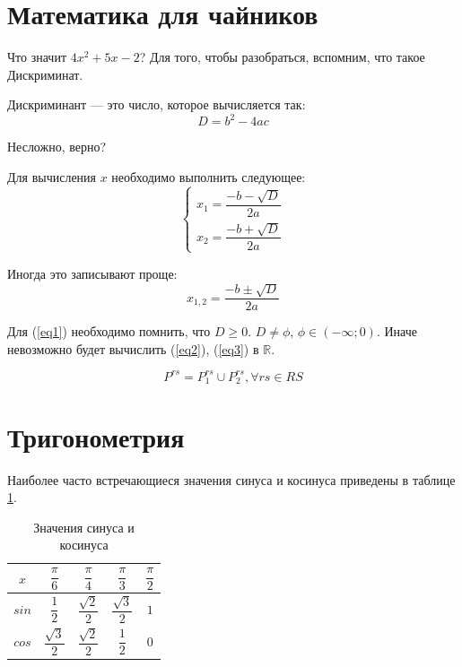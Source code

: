 \documentclass[120.214pt]{article}%
\begin{document}
\section{Математика для чайников}
Что значит $ 4x^{2} + 5x -2$?
Для того, чтобы разобраться, вспомним, что такое Дискриминат.

Дискриминант --- это число, которое вычисляется так:
\begin{equation}
D = b^{2} - 4ac
\label{eq1}
\end{equation}

Несложно, верно?

Для вычисления $ x $ необходимо выполнить следующее:
\begin{equation}
\left\lbrace 
\begin{aligned}
x_{1} = \dfrac{-b - \sqrt{D}}{2a}\\
x_{2} = \dfrac{-b + \sqrt{D}}{2a}
\end{aligned}
\right.
\label{eq2}
\end{equation}

Иногда это записывают проще:
\begin{equation}
x_{1,2} = \dfrac{-b ± \sqrt{D}}{2a}
\label{eq3}
\end{equation}

Для (\ref{eq1}) необходимо помнить, что $ D \ge 0 $.
$ D \ne \phi $, $ \phi \in (-\infty ;0) $. Иначе невозможно будет вычислить (\ref{eq2}), (\ref{eq3}) в $ \mathbb{R} $.

\[ P^{rs} = P^{rs}_1 \cup P^{rs}_2, \forall rs \in RS \]

\section{Тригонометрия}
Наиболее часто встречающиеся значения синуса и косинуса приведены в таблице \ref{tab_sincos}.

\begin{table}[hb]
	\centering
	\caption{Значения синуса и косинуса}
	\label{tab_sincos}
\begin{tabular}{|c|c|c|c|c|}
	\hline 
	$ x $ & $ \dfrac{\pi}{6} $ & $ \dfrac{\pi}{4} $ & $ \dfrac{\pi}{3} $ & $ \dfrac{\pi}{2} $ \\ 
	\hline 
	$ sin $ & $ \dfrac{1}{2} $ & $ \dfrac{\sqrt{2}}{2} $ & $ \dfrac{\sqrt{3}}{2} $ & $ 1 $ \\ 
	\hline 
	$ cos $ & $ \dfrac{\sqrt{3}}{2} $ & $ \dfrac{\sqrt{2}}{2} $ & $ \dfrac{1}{2} $ & $ 0 $ \\ 
	\hline 
\end{tabular} 
\end{table} 
\end{document}
